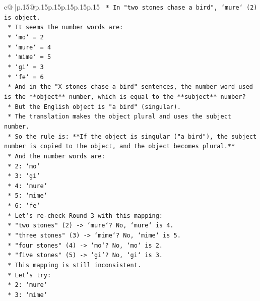 \documentclass{article}
\begin{document}
{\begin{supertabular}{c@{$\;$}|p{.15\linewidth}@{}p{.15\linewidth}p{.15\linewidth}p{.15\linewidth}p{.15\linewidth}p{.15\linewidth}}
{{{\texttt{        *   In "two stones chase a bird", `mure` (2) is object.} \\
\texttt{        *   It seems the number words are:} \\
\texttt{            *   `mo` = 2} \\
\texttt{            *   `mure` = 4} \\
\texttt{            *   `mime` = 5} \\
\texttt{            *   `gi` = 3} \\
\texttt{            *   `fe` = 6} \\
\texttt{        *   And in the "X stones chase a bird" sentences, the number word used is the **object** number, which is equal to the **subject** number?} \\
\texttt{        *   But the English object is "a bird" (singular).} \\
\texttt{        *   The translation makes the object plural and uses the subject number.} \\
\texttt{        *   So the rule is: **If the object is singular ("a bird"), the subject number is copied to the object, and the object becomes plural.**} \\
\texttt{        *   And the number words are:} \\
\texttt{            *   2: `mo`} \\
\texttt{            *   3: `gi`} \\
\texttt{            *   4: `mure`} \\
\texttt{            *   5: `mime`} \\
\texttt{            *   6: `fe`} \\
\texttt{        *   Let's re{-}check Round 3 with this mapping:} \\
\texttt{            *   "two stones" (2) {-}> `mure`? No, `mure` is 4.} \\
\texttt{            *   "three stones" (3) {-}> `mime`? No, `mime` is 5.} \\
\texttt{            *   "four stones" (4) {-}> `mo`? No, `mo` is 2.} \\
\texttt{            *   "five stones" (5) {-}> `gi`? No, `gi` is 3.} \\
\texttt{        *   This mapping is still inconsistent.} \\
\texttt{        *   Let's try:} \\
\texttt{            *   2: `mure`} \\
\texttt{            *   3: `mime`} \\
}}}
\end{supertabular}}
\end{document}
